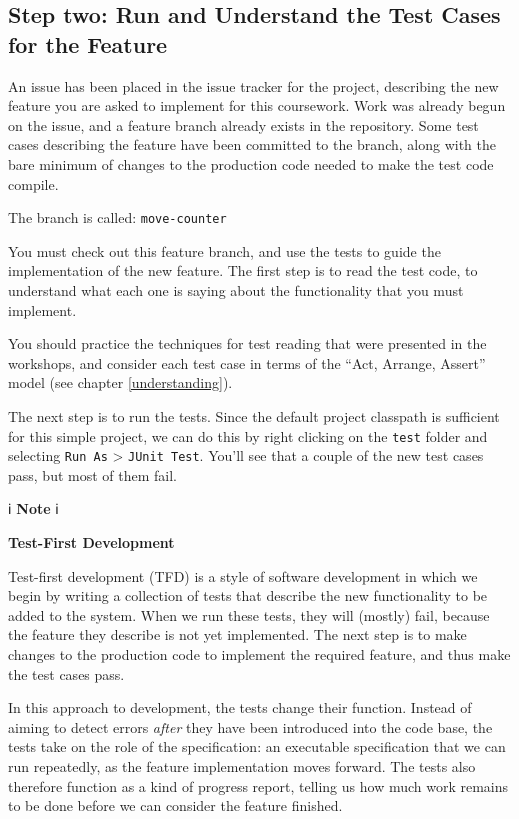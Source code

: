 \documentclass[
]{book}
\begin{document}
\hypertarget{runderstand}{%
\subsection{Step two: Run and Understand the Test Cases for the Feature}\label{runderstand}}

An issue has been placed in the issue tracker for the project, describing the new feature you are asked to implement for this coursework. Work was already begun on the issue, and a feature branch already exists in the repository. Some test cases describing the feature have been committed to the branch, along with the bare minimum of changes to the production code needed to make the test code compile.

The branch is called: \texttt{move-counter}

You must check out this feature branch, and use the tests to guide the implementation of the new feature. The first step is to read the test code, to understand what each one is saying about the functionality that you must implement.

You should practice the techniques for test reading that were presented in the workshops, and consider each test case in terms of the ``Act, Arrange, Assert'' model (see chapter \ref{understanding}).

The next step is to run the tests. Since the default project classpath is sufficient for this simple project, we can do this by right clicking on the \texttt{test} folder and selecting \texttt{Run\ As} \textgreater{} \texttt{JUnit\ Test}. You'll see that a couple of the new test cases pass, but most of them fail.

ℹ️ \textbf{Note} ℹ️

\textbf{Test-First Development}

Test-first development (TFD) is a style of software development in which we begin by writing a collection of tests that describe the new functionality to be added to the system. When we run these tests, they will (mostly) fail, because the feature they describe is not yet implemented. The next step is to make changes to the production code to implement the required feature, and thus make the test cases pass.

In this approach to development, the tests change their function. Instead of aiming to detect errors \emph{after} they have been introduced into the code base, the tests take on the role of the specification: an executable specification that we can run repeatedly, as the feature implementation moves forward. The tests also therefore function as a kind of progress report, telling us how much work remains to be done before we can consider the feature finished.
\end{document}
